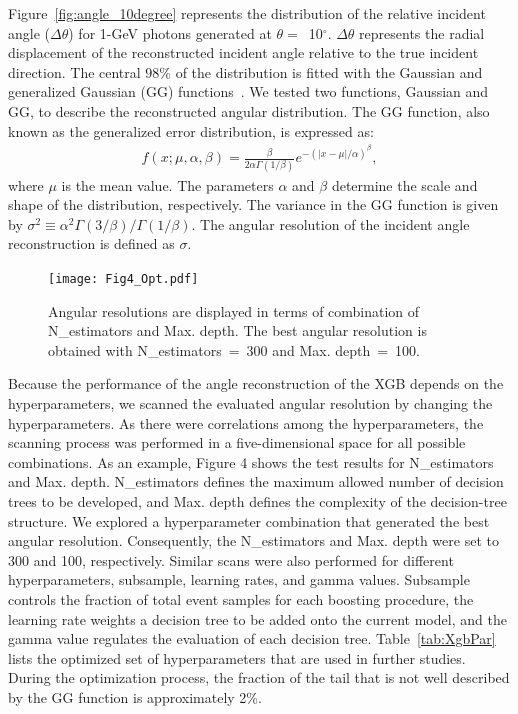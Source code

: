 \documentclass[preprint,12pt,times,a4paper]{elsarticle}
\begin{document}
Figure~\ref{fig:angle_10degree} represents the distribution of the relative incident angle ($\Delta\theta$) for 1-GeV photons generated at $\theta=$~10$^{\circ}$. $\Delta\theta$ represents the radial displacement of the reconstructed incident angle relative to the true incident direction. The central 98\% of the distribution is fitted with the Gaussian and generalized Gaussian (GG) functions~\cite{GGfun}. We tested two functions, Gaussian and GG, to describe the reconstructed angular distribution. The GG function, also known as the generalized error distribution, is expressed as:
\begin{eqnarray} 
f(x; \mu, \alpha, \beta) = \frac{\beta}{2 \alpha \Gamma(1/\beta)}e^{-(|x-\mu|/\alpha)^\beta},
\label{eqn:gg}
\end{eqnarray}
where $\mu$ is the mean value. The parameters $\alpha$ and $\beta$ determine the scale and shape of the distribution, respectively. The variance in the GG function is given by $\sigma^2 \equiv \alpha^2 \Gamma(3/\beta) / \Gamma(1/\beta)$. The angular resolution of the incident angle reconstruction is defined as $\sigma$.

\begin{figure}[!hbt]
\centering
\texttt{[image: Fig4\_Opt.pdf]}
\caption{Angular resolutions are displayed in terms of combination of N\_estimators and Max. depth. The best angular resolution is obtained with N\_estimators~=~300 and Max. depth~=~100. }
\label{fig:par_scan}
\end{figure}

Because the performance of the angle reconstruction of the XGB depends on the hyperparameters, we scanned the evaluated angular resolution by changing the hyperparameters. As there were correlations among the hyperparameters, the scanning process was performed in a five-dimensional space for all possible combinations. As an example, Figure 4 shows the test results for N\_estimators and Max. depth. N\_estimators defines the maximum allowed number of decision trees to be developed, and Max. depth defines the complexity of the decision-tree structure. We explored a hyperparameter combination that generated the best angular resolution. Consequently, the N\_estimators and Max. depth were set to 300 and 100, respectively. Similar scans were also performed for different hyperparameters, subsample, learning rates, and gamma values. Subsample controls the fraction of total event samples for each boosting procedure, the learning rate weights a decision tree to be added onto the current model, and the gamma value regulates the evaluation of each decision tree. Table~\ref{tab:XgbPar} lists the optimized set of hyperparameters that are used in further studies. During the optimization process, the fraction of the tail that is not well described by the GG function is approximately 2\%.
\end{document}
